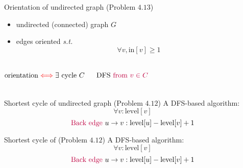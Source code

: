 \begin{frame}{}
  \begin{exampleblock}{Orientation of undirected graph (Problem $4.13$)}
    \begin{itemize}
      \item undirected (connected) graph $G$ 
      \item edges oriented \emph{s.t.} 
	\[
	  \forall v, \text{in}[v] \ge 1
	\]
    \end{itemize}
  \end{exampleblock}

  \pause
  \begin{columns}
      \[
	\text{orientation} \textcolor{red}{\iff} \exists \text{ cycle } C
      \]

      \pause
      \[
	\text{DFS \textcolor{purple}{from} } \textcolor{purple}{v \in C}
      \]

      \pause
      \vspace{0.50cm}
      \pause
  \end{columns}
\end{frame}

\begin{frame}{}
  \begin{exampleblock}{Shortest cycle of undirected graph (Problem $4.12$)}
    A  DFS-based algorithm:
    \[
      \forall v: \text{level}[v]
    \]
    \[
      \text{\textcolor{purple}{Back edge }} u \to v: \text{level}[u] - \text{level}[v] + 1
    \]
  \end{exampleblock}

  \pause
\end{frame}

\begin{frame}{}
  \begin{exampleblock}{Shortest cycle of  (Problem $4.12$)}
    A  DFS-based algorithm:
    \[
      \forall v: \text{level}[v]
    \]
    \[
      \text{\textcolor{purple}{Back edge }} u \to v: \text{level}[u] - \text{level}[v] + 1
    \]
  \end{exampleblock}

  \pause

\end{frame}
